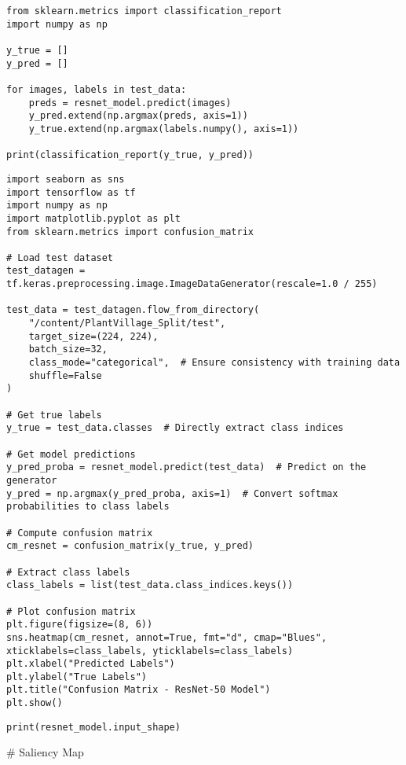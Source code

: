 \documentclass{article}
\begin{document}
\begin{lstlisting}
from sklearn.metrics import classification_report
import numpy as np

y_true = []
y_pred = []

for images, labels in test_data:
    preds = resnet_model.predict(images)
    y_pred.extend(np.argmax(preds, axis=1))
    y_true.extend(np.argmax(labels.numpy(), axis=1))

print(classification_report(y_true, y_pred))
\end{lstlisting}
\begin{lstlisting}
import seaborn as sns
import tensorflow as tf
import numpy as np
import matplotlib.pyplot as plt
from sklearn.metrics import confusion_matrix

# Load test dataset
test_datagen = tf.keras.preprocessing.image.ImageDataGenerator(rescale=1.0 / 255)

test_data = test_datagen.flow_from_directory(
    "/content/PlantVillage_Split/test",
    target_size=(224, 224),
    batch_size=32,
    class_mode="categorical",  # Ensure consistency with training data
    shuffle=False
)

# Get true labels
y_true = test_data.classes  # Directly extract class indices

# Get model predictions
y_pred_proba = resnet_model.predict(test_data)  # Predict on the generator
y_pred = np.argmax(y_pred_proba, axis=1)  # Convert softmax probabilities to class labels

# Compute confusion matrix
cm_resnet = confusion_matrix(y_true, y_pred)

# Extract class labels
class_labels = list(test_data.class_indices.keys())

# Plot confusion matrix
plt.figure(figsize=(8, 6))
sns.heatmap(cm_resnet, annot=True, fmt="d", cmap="Blues", xticklabels=class_labels, yticklabels=class_labels)
plt.xlabel("Predicted Labels")
plt.ylabel("True Labels")
plt.title("Confusion Matrix - ResNet-50 Model")
plt.show()
\end{lstlisting}
\begin{lstlisting}
print(resnet_model.input_shape)

\end{lstlisting}
# Saliency Map
\end{document}
